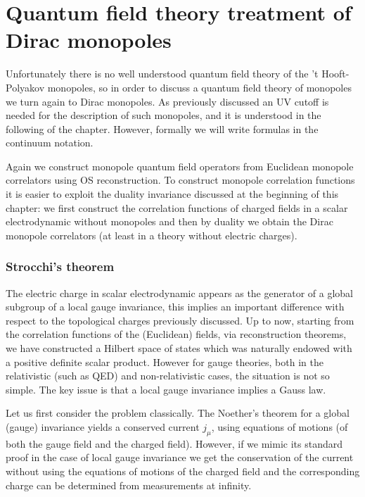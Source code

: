 \documentclass[../main/main.tex]{subfiles}
\begin{document}

\section{Quantum field theory treatment of Dirac monopoles}

Unfortunately there is no well understood quantum field theory of the 't Hooft-Polyakov monopoles, so in order to discuss a quantum field theory of monopoles we turn again to Dirac monopoles. As previously discussed an UV cutoff is needed for the description of such monopoles, and it is understood in the following of the chapter. However, formally we will write formulas in the continuum notation. 

Again we construct monopole quantum field operators from Euclidean monopole correlators using OS reconstruction. To construct monopole correlation functions it is easier to exploit the duality invariance discussed at the beginning of this chapter: we first construct the correlation functions of charged fields in a scalar electrodynamic without monopoles and then by duality we obtain the Dirac monopole correlators (at least in a theory without electric charges). 

\subsubsection{Strocchi's theorem}

The electric charge in scalar electrodynamic appears as the generator of a global subgroup of a local gauge invariance, this implies an important difference with respect to the topological charges previously discussed. 
Up to now, starting from the correlation functions of the (Euclidean) fields, via reconstruction theorems, we have constructed a Hilbert space of states which was naturally endowed with a positive definite scalar product. 
However for gauge theories, both in the relativistic (such as QED) and non-relativistic cases, the situation is not so simple. The key issue is that a local gauge invariance implies a Gauss law. 

Let us first consider the problem classically. The Noether's theorem for a global (gauge) invariance yields a conserved current $j_\mu$, using equations of motions (of both the gauge field and the charged field). However, if we mimic its standard proof in the case of local gauge invariance we get the conservation of the current without using the equations of motions of the charged field and the corresponding charge can be determined from measurements at infinity. 
\end{document}
